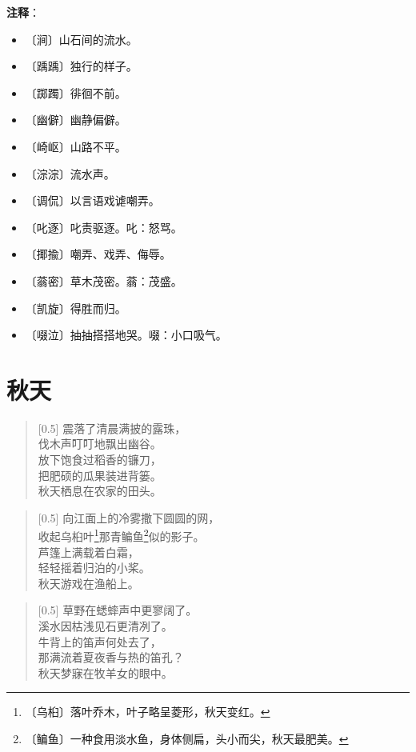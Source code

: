 \documentclass[12pt,UTF-8,openany]{ctexbook}
\begin{document}
\newpage

\textbf{注释}：

\vspace{-1em}

\begin{itemize}
    \setlength\itemsep{-0.2em}
    \item 〔涧〕山石间的流水。
    \item 〔踽踽〕独行的样子。
    \item 〔踯躅〕徘徊不前。
    \item 〔幽僻〕幽静偏僻。
    \item 〔崎岖〕山路不平。
    \item 〔淙淙〕流水声。
    \item 〔调侃〕以言语戏谑嘲弄。
    \item 〔叱逐〕叱责驱逐。叱：怒骂。
    \item 〔揶揄〕嘲弄、戏弄、侮辱。
    \item 〔蓊密〕草木茂密。蓊：茂盛。
    \item 〔凯旋〕得胜而归。
    \item 〔啜泣〕抽抽搭搭地哭。啜：小口吸气。
\end{itemize}

\chapter{秋天}

\begin{normalsize}
    
    \begin{verse}[0.5\linewidth]
        震落了清晨满披的露珠， \\
        伐木声叮叮地飘出幽谷。 \\
        放下饱食过稻香的镰刀， \\
        把肥硕的瓜果装进背篓。 \\
        秋天栖息在农家的田头。
    \end{verse}
    
    
    \begin{verse}[0.5\linewidth]
        向江面上的冷雾撒下圆圆的网， \\
        收起乌桕叶\footnote{〔乌桕〕落叶乔木，叶子略呈菱形，秋天变红。}那青鳊鱼\footnote{〔鳊鱼〕一种食用淡水鱼，身体侧扁，头小而尖，秋天最肥美。}似的影子。 \\
        芦篷上满载着白霜， \\
        轻轻摇着归泊的小桨。 \\
        秋天游戏在渔船上。
    \end{verse}
    
    
    \begin{verse}[0.5\linewidth]
        草野在蟋蟀声中更寥阔了。 \\
        溪水因枯浅见石更清冽了。 \\
        牛背上的笛声何处去了， \\
        那满流着夏夜香与热的笛孔？ \\
        秋天梦寐在牧羊女的眼中。
    \end{verse}
    
\end{normalsize}
\end{document}
